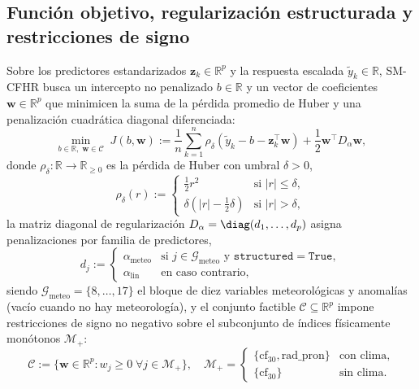 \subsection{Función objetivo, regularización estructurada y restricciones de signo}

Sobre los predictores estandarizados $\mathbf{z}_k \in \mathbb{R}^p$ y la respuesta escalada $\tilde{y}_k \in \mathbb{R}$, SM-CFHR busca un intercepto no penalizado $b \in \mathbb{R}$ y un vector de coeficientes $\mathbf{w} \in \mathbb{R}^p$ que minimicen la suma de la pérdida promedio de Huber y una penalización cuadrática diagonal diferenciada:
\begin{equation}
\min_{b \in \mathbb{R},\; \mathbf{w} \in \mathcal{C}} \; J(b, \mathbf{w}) := \frac{1}{n}\sum_{k=1}^{n} \rho_\delta\!\left(\tilde{y}_k - b - \mathbf{z}_k^\top \mathbf{w}\right) + \frac{1}{2}\mathbf{w}^\top D_\alpha \mathbf{w},
\label{eq:objetivo_smcfhr}
\end{equation}
donde $\rho_\delta : \mathbb{R} \to \mathbb{R}_{\ge 0}$ es la pérdida de Huber con umbral $\delta > 0$,
\begin{equation}
\rho_\delta(r) := \begin{cases}
\frac{1}{2} r^2 & \text{si } |r| \le \delta, \\
\delta\left(|r| - \frac{1}{2}\delta\right) & \text{si } |r| > \delta,
\end{cases}
\label{eq:huber}
\end{equation}
la matriz diagonal de regularización $D_\alpha = \diag(d_1,\dots,d_p)$ asigna penalizaciones por familia de predictores,
\begin{equation}
d_j := \begin{cases}
\alpha_{\mathrm{meteo}} & \text{si } j \in \mathcal{G}_{\mathrm{meteo}} \text{ y } \texttt{structured}=\texttt{True}, \\
\alpha_{\mathrm{lin}} & \text{en caso contrario},
\end{cases}
\label{eq:d_alpha}
\end{equation}
siendo $\mathcal{G}_{\mathrm{meteo}} = \{8,\dots,17\}$ el bloque de diez variables meteorológicas y anomalías (vacío cuando no hay meteorología), y el conjunto factible $\mathcal{C} \subseteq \mathbb{R}^p$ impone restricciones de signo no negativo sobre el subconjunto de índices físicamente monótonos $\mathcal{M}_+$:
\begin{equation}
\mathcal{C} := \{\mathbf{w} \in \mathbb{R}^p : w_j \ge 0 \;\forall j \in \mathcal{M}_+\},
\quad
\mathcal{M}_+ = \begin{cases}
\{\mathrm{cf}_{30}, \mathrm{rad\_pron}\} & \text{con clima}, \\
\{\mathrm{cf}_{30}\} & \text{sin clima}.
\end{cases}
\label{eq:conjunto_factible}
\end{equation}

